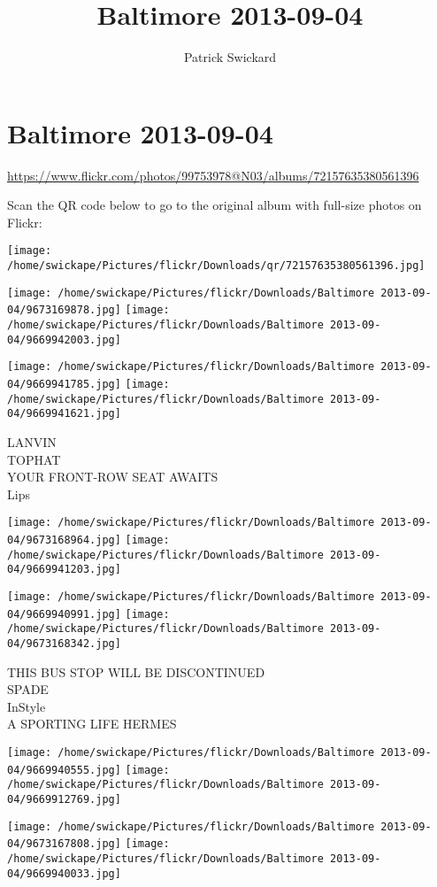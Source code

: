 \documentclass[10pt,letterpaper]{article}
\title{Baltimore 2013-09-04}
\author{Patrick Swickard}
\date{}
\begin{document}
\section*{Baltimore 2013-09-04}

\url{https://www.flickr.com/photos/99753978@N03/albums/72157635380561396}

Scan the QR code below to go to the original album with full-size photos on Flickr:

\texttt{[image: /home/swickape/Pictures/flickr/Downloads/qr/72157635380561396.jpg]}
\pagebreak

\texttt{[image: /home/swickape/Pictures/flickr/Downloads/Baltimore 2013-09-04/9673169878.jpg]}
\texttt{[image: /home/swickape/Pictures/flickr/Downloads/Baltimore 2013-09-04/9669942003.jpg]}

\texttt{[image: /home/swickape/Pictures/flickr/Downloads/Baltimore 2013-09-04/9669941785.jpg]}
\texttt{[image: /home/swickape/Pictures/flickr/Downloads/Baltimore 2013-09-04/9669941621.jpg]}

LANVIN\\
TOPHAT\\
YOUR FRONT{-}ROW SEAT AWAITS\\
Lips
\pagebreak

\texttt{[image: /home/swickape/Pictures/flickr/Downloads/Baltimore 2013-09-04/9673168964.jpg]}
\texttt{[image: /home/swickape/Pictures/flickr/Downloads/Baltimore 2013-09-04/9669941203.jpg]}

\texttt{[image: /home/swickape/Pictures/flickr/Downloads/Baltimore 2013-09-04/9669940991.jpg]}
\texttt{[image: /home/swickape/Pictures/flickr/Downloads/Baltimore 2013-09-04/9673168342.jpg]}

THIS BUS STOP WILL BE DISCONTINUED\\
SPADE\\
InStyle\\
A SPORTING LIFE HERMES
\pagebreak

\texttt{[image: /home/swickape/Pictures/flickr/Downloads/Baltimore 2013-09-04/9669940555.jpg]}
\texttt{[image: /home/swickape/Pictures/flickr/Downloads/Baltimore 2013-09-04/9669912769.jpg]}

\texttt{[image: /home/swickape/Pictures/flickr/Downloads/Baltimore 2013-09-04/9673167808.jpg]}
\texttt{[image: /home/swickape/Pictures/flickr/Downloads/Baltimore 2013-09-04/9669940033.jpg]}
\end{document}
